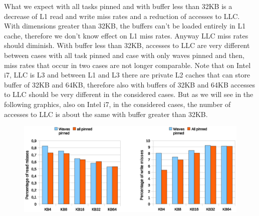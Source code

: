 \begin{table}[tbp]
\centering%
\hspace{4em}
\label{tab:assignment}
\caption{CPUs assignment}
\end{table}

What we expect with all tasks pinned and with buffer less than 32KB is a decrease of L1 read and write miss rates and a reduction of accesses to LLC. 
With dimensions greater than 32KB, the buffers can't be loaded entirely in L1 cache, therefore we don't know effect on L1 miss rates. Anyway LLC miss 
rates should diminish. With buffer less than 32KB, accesses to LLC are very different between cases with all task pinned and case with only waves 
pinned and then, miss rates that occur in two cases are not longer comparable. Note that on Intel i7, LLC is L3 and between L1 and L3 there are private L2 
caches that can store buffer of 32KB and 64KB, therefore also with buffers of 32KB and 64KB accesses to LLC should be very different in the considered cases.
But as we will see in the following graphics, also on Intel i7, in the
considered cases, the number of accesses to LLC is about the same with buffer greater 
than 32KB. 

\begin{figure}[htbp]
\centering
\includegraphics[width=\widefigure]{images/cpuaff/cpuaff_l1_load_store_Xeon.eps}
\caption{}
\label{fig:cpuaff_l1_load_store_xeon}
\end{figure}

